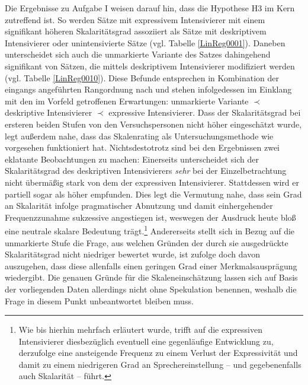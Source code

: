 Die Ergebnisse zu Aufgabe I weisen darauf hin, dass die Hypothese H3 im Kern zutreffend ist. So werden Sätze mit expressivem Intensivierer mit einem signifikant höheren Skalaritätsgrad assoziiert als Sätze mit deskriptivem Intensivierer oder unintensivierte Sätze (vgl. {Tabelle \ref{LinReg0001}}). Daneben unterscheidet sich auch die unmarkierte Variante des Satzes dahingehend signifikant von Sätzen, die mittels deskriptivem Intensivierer modifiziert werden (vgl. {Tabelle \ref{LinReg0010}}). Diese Befunde entsprechen in Kombination der eingangs angeführten Rangordnung nach {\citet[133]{Gutzmann.2019a}} und stehen infolgedessen im Einklang mit den im Vorfeld getroffenen Erwartungen: unmarkierte Variante $\prec$ deskriptive Intensivierer $\prec$ expressive Intensivierer. Dass der Skalaritätsgrad bei ersteren beiden Stufen von den Versuchspersonen nicht höher eingeschätzt wurde, legt außerdem nahe, dass das Skalenrating als Untersuchungsmethode wie vorgesehen funktioniert hat. Nichtsdestotrotz sind bei den Ergebnissen zwei eklatante Beobachtungen zu machen: Einerseits unterscheidet sich der Skalaritätsgrad des deskriptiven Intensivierers \textit{sehr} bei der Einzelbetrachtung nicht übermäßig stark von dem der expressiven Intensivierer. Stattdessen wird er partiell sogar als höher empfunden. Dies legt die Vermutung nahe, dass sein Grad an Skalarität infolge pragmatischer Abnutzung und damit einhergehender Frequenzzunahme sukzessive angestiegen ist, weswegen der Ausdruck heute bloß eine neutrale skalare Bedeutung trägt.\footnote{Wie bis hierhin mehrfach erläutert wurde, trifft auf die expressiven Intensivierer diesbezüglich eventuell eine gegenläufige Entwicklung zu, derzufolge eine ansteigende Frequenz zu einem Verlust der Expressivität und damit zu einem niedrigeren Grad an Sprechereinstellung -- und gegebenenfalls auch Skalarität -- führt.} Andererseits stellt sich in Bezug auf die unmarkierte Stufe die Frage, aus welchen Gründen der durch sie ausgedrückte Skalaritätsgrad nicht niedriger bewertet wurde, ist {\citet[133]{Gutzmann.2019a}} zufolge doch davon auszugehen, dass diese allenfalls einen geringen Grad einer Merkmalsausprägung wiedergibt. Die genauen Gründe für die Skaleneinschätzung lassen sich auf Basis der vorliegenden Daten allerdings nicht ohne Spekulation benennen, weshalb die Frage in diesem Punkt unbeantwortet bleiben muss.


